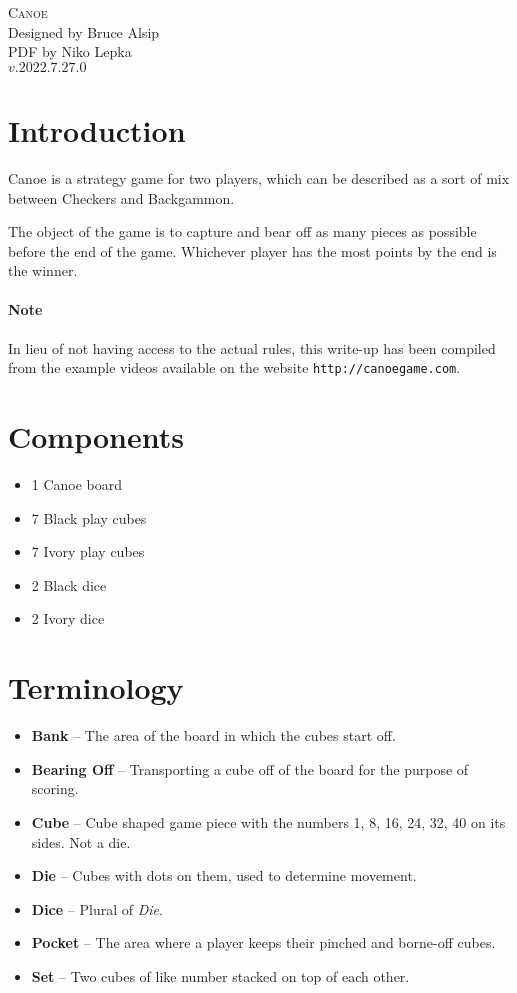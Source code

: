 \documentclass[a4paper]{article}
\begin{document}
\begin{center}
    \Huge \textsc{Canoe}\\
    \LARGE Designed by Bruce Alsip\\
    \large PDF by Niko Lepka\\
    $v.2022.7.27.0$
\end{center}

\section{Introduction}
Canoe is a strategy game for two players, which can be described as a sort of mix between Checkers and Backgammon.

The object of the game is to capture and bear off as many pieces as possible before the end of the game.
Whichever player has the most points by the end is the winner.

\paragraph{Note} In lieu of not having access to the actual rules, this write-up has been compiled from the example videos available on the website \texttt{http://canoegame.com}.

\section{Components}
\begin{itemize}
    \item 1 Canoe board
    \item 7 Black play cubes
    \item 7 Ivory play cubes
    \item 2 Black dice
    \item 2 Ivory dice
\end{itemize}

\section{Terminology}
\begin{itemize}
    \item \textbf{Bank} -- The area of the board in which the cubes start off.
    \item \textbf{Bearing Off} -- Transporting a cube off of the board for the purpose of scoring.
    \item \textbf{Cube} -- Cube shaped game piece with the numbers 1, 8, 16, 24, 32, 40 on its sides. Not a die.
    \item \textbf{Die} -- Cubes with dots on them, used to determine movement.
    \item \textbf{Dice} -- Plural of \textit{Die}.
    \item \textbf{Pocket} -- The area where a player keeps their pinched and borne-off cubes.
    \item \textbf{Set} -- Two cubes of like number stacked on top of each other.
\end{itemize}
\end{document}
